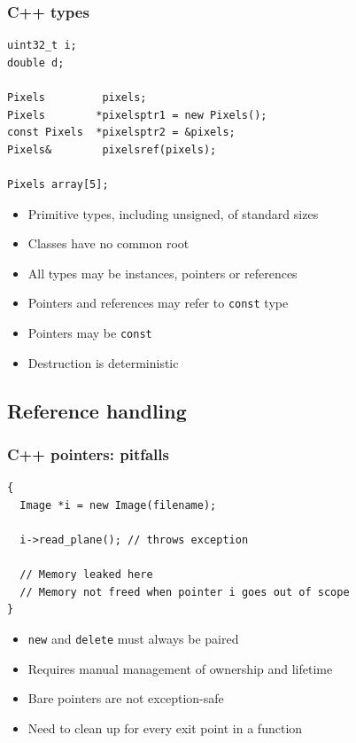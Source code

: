 \documentclass{beamer}
\begin{document}
\begin{frame}[fragile]
  \frametitle{C++ types}
  \begin{lstlisting}
uint32_t i;
double d;

Pixels         pixels;
Pixels        *pixelsptr1 = new Pixels();
const Pixels  *pixelsptr2 = &pixels;
Pixels&        pixelsref(pixels);

Pixels array[5];
\end{lstlisting}
  \begin{itemize}
  \item Primitive types, including unsigned, of standard sizes
  \item Classes have no common root
  \item All types may be instances, pointers or references
  \item Pointers and references may refer to \texttt{const} type
  \item Pointers may be \texttt{const}
  \item Destruction is deterministic
  \end{itemize}
\end{frame}

\subsection{Reference handling}

\begin{frame}[fragile]
  \frametitle{C++ pointers: pitfalls}
  \begin{lstlisting}
{
  Image *i = new Image(filename);

  i->read_plane(); // throws exception

  // Memory leaked here
  // Memory not freed when pointer i goes out of scope
}
\end{lstlisting}
  \begin{itemize}
    \item \texttt{new} and \texttt{delete} must always be paired
    \item Requires manual management of ownership and lifetime
    \item Bare pointers are not exception-safe
    \item Need to clean up for every exit point in a function
  \end{itemize}
\end{frame}
\end{document}
